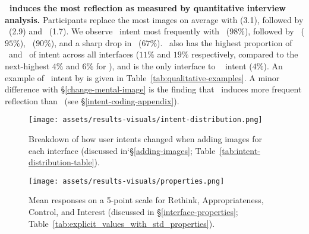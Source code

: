 \textbf{\agonistic~induces the most reflection as measured by quantitative interview analysis.}
Participants replace the most images on average with \agonistic (3.1), followed by ~(2.9) and \diverse~(1.7).
We observe \direct~intent most frequently with \baseline~($98\%$), followed by \diverse~($95\%$), ~($90\%$), and a sharp drop in \agonistic~($67\%$). \agonistic~also has the highest proportion of \reminder~and \expansion~of intent across all interfaces ($11\%$ and $19\%$ respectively, compared to the next-highest $4\%$ and $6\%$ for ), and is the only interface to \challenge~ intent ($4\%$). 
An example of \challenge~intent by  is given in Table~\ref{tab:qualitative-examples}. A minor difference with \S\ref{change-mental-image} is the finding that \diverse~induces more frequent reflection than \baseline~(see \S\ref{intent-coding-appendix}).











\begin{figure}[!b]
    \begin{minipage}[t]{0.45\textwidth}
        \centering
        \texttt{[image: assets/results-visuals/intent-distribution.png]}
        \caption{Breakdown of how user intents changed when adding images for each interface (discussed in`\S\ref{adding-images}; Table~\ref{tab:intent-distribution-table}).}
        \label{fig:intents_distributed}
    \end{minipage}
    \hfill
    \begin{minipage}[t]{0.53\textwidth}
        \centering
        \texttt{[image: assets/results-visuals/properties.png]}
        \caption{Mean responses on a 5-point scale for Rethink, Appropriateness, Control, and Interest (discussed in \S\ref{interface-properties}; Table~\ref{tab:explicit_values_with_std_properties}).}
        \label{fig:properties-visual}
    \end{minipage}
\end{figure}